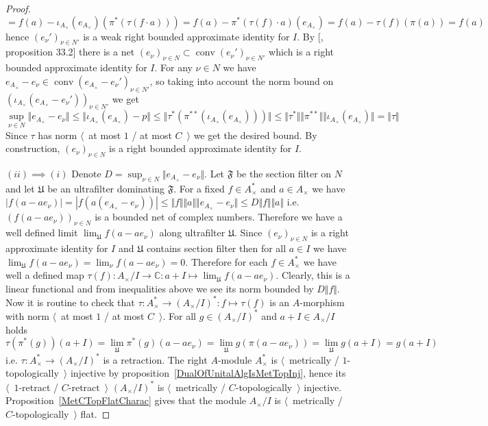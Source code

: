 \begin{proof}
$$
=f(a)-\iota_{A_\times }(e_{A_\times })(\pi^*(\tau(f\cdot a)))
=f(a)-\pi^*(\tau(f)\cdot a)(e_{A_\times })
=f(a)-\tau(f)(\pi(a))
=f(a)
$$
hence ${(e_\nu')}_{\nu\in N'}$ is a weak right bounded approximate identity for
$I$. By [\cite{AppIdAndFactorInBanAlg}, proposition 33.2] there is a net
${(e_\nu)}_{\nu\in N}\subset\operatorname{conv}{(e_\nu')}_{\nu\in N'}$ which is
a right bounded approximate identity for $I$. For any $\nu\in N$ we have
$e_{A_\times }-e_\nu\in\operatorname{conv}{(e_{A_\times }-e_\nu')}_{\nu\in N'}$,
so taking into account the norm bound 
on ${(\iota_{A_\times }(e_{A_\times}-e_\nu'))}_{\nu\in N'}$ we get 
$$
\sup_{\nu\in N}\Vert e_{A_\times }-e_\nu\Vert
\leq\Vert \iota_{A_\times }(e_{A_\times })-p\Vert
\leq\Vert\tau^*(\pi^{**}(\iota_{A_\times }(e_{A_\times })))\Vert
\leq\Vert\tau^*\Vert\Vert\pi^{**}\Vert\Vert\iota_{A_\times }(e_{A_\times })\Vert
=\Vert\tau\Vert
$$
Since $\tau$ has norm $\langle$~at most $1$ / at most $C$~$\rangle$ we get the
desired bound. By construction, ${(e_\nu)}_{\nu\in N}$ is a right bounded
approximate identity for $I$.

$(ii)\implies (i)$ Denote $D=\sup_{\nu\in N}\Vert e_{A_\times }-e_\nu\Vert$.
Let $\mathfrak{F}$ be the section filter on $N$ and let $\mathfrak{U}$ be an
ultrafilter dominating $\mathfrak{F}$. For a fixed $f\in A_\times ^*$ 
and $a\in A_\times $ we have 
$|f(a-a e_\nu)|=|f(a(e_{A_\times }-e_\nu))|
\leq\Vert f\Vert\Vert a\Vert\Vert e_{A_\times }-e_\nu\Vert
\leq D\Vert f\Vert\Vert a\Vert$
i.e. ${(f(a-ae_\nu))}_{\nu\in N}$ is a bounded net of complex numbers. Therefore
we have a well defined limit $\lim_{\mathfrak{U}}f(a-ae_\nu)$ along ultrafilter
$\mathfrak{U}$. Since ${(e_\nu)}_{\nu\in N}$ is a right approximate identity for
$I$ and $\mathfrak{U}$ contains section filter then for all $a\in I$ we have
$\lim_{\mathfrak{U}}f(a-ae_\nu)=\lim_{\nu}f(a-ae_\nu)=0$. Therefore for each
$f\in A_\times ^*$ we have well a defined map $\tau(f):A_\times /I\to
\mathbb{C}:a+I\mapsto \lim_{\mathfrak{U}} f(a-ae_\nu)$. Clearly, this is a
linear functional and from inequalities above we see its norm bounded 
by $D\Vert f\Vert$. Now it is routine to check 
that $\tau:A_\times ^*\to {(A_\times /I)}^*:f\mapsto \tau(f)$ is 
an $A$-morphism with norm $\langle$~at most $1$ / at most $C$~$\rangle$. 
For all $g\in{(A_\times /I)}^*$ and $a+I\in A_\times /I$ holds
$$
\tau(\pi^*(g))(a+I)
=\lim_{\mathfrak{U}}\pi^*(g)(a-ae_\nu)
=\lim_{\mathfrak{U}} g(\pi(a-ae_\nu))
=\lim_{\mathfrak{U}} g(a+I)
=g(a+I)
$$
i.e. $\tau:A_\times ^*\to {(A_\times /I)}^*$ is a retraction. The right
$A$-module $A_\times ^*$ is $\langle$~metrically / $1$-topologically~$\rangle$
injective by proposition~\ref{DualOfUnitalAlgIsMetTopInj}, hence its
$\langle$~$1$-retract / $C$-retract~$\rangle$ ${(A_\times /I)}^*$ is
$\langle$~metrically / $C$-topologically~$\rangle$ injective. 
Proposition~\ref{MetCTopFlatCharac} gives that the
module $A_\times /I$ is $\langle$~metrically / $C$-topologically~$\rangle$ flat.
\end{proof}

